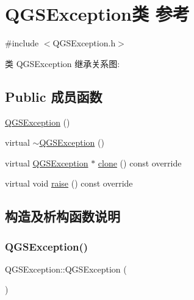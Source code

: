 \hypertarget{class_q_g_s_exception}{}\section{Q\+G\+S\+Exception类 参考}
\label{class_q_g_s_exception}


{\ttfamily \#include $<$Q\+G\+S\+Exception.\+h$>$}



类 Q\+G\+S\+Exception 继承关系图\+:
\subsection*{Public 成员函数}
\begin{DoxyCompactItemize}
\item 
\mbox{\hyperlink{class_q_g_s_exception_aa31af3ad76a38936e999974ed1d8d423}{Q\+G\+S\+Exception}} ()
\item 
virtual \mbox{\hyperlink{class_q_g_s_exception_a974e3582111a5ddf9dbe2443148b602b}{$\sim$\+Q\+G\+S\+Exception}} ()
\item 
virtual \mbox{\hyperlink{class_q_g_s_exception}{Q\+G\+S\+Exception}} $\ast$ \mbox{\hyperlink{class_q_g_s_exception_a5b4e0c020491f88d8ed6644f1e25e082}{clone}} () const override
\item 
virtual void \mbox{\hyperlink{class_q_g_s_exception_a78e6d3c9f92bbc94440d4c2e946beed2}{raise}} () const override
\end{DoxyCompactItemize}


\subsection{构造及析构函数说明}
\mbox{\label{class_q_g_s_exception_aa31af3ad76a38936e999974ed1d8d423}} 
\subsubsection{\texorpdfstring{Q\+G\+S\+Exception()}{QGSException()}}
{\footnotesize\ttfamily Q\+G\+S\+Exception\+::\+Q\+G\+S\+Exception (\begin{DoxyParamCaption}{ }\end{DoxyParamCaption})}

\mbox{\label{class_q_g_s_exception_a974e3582111a5ddf9dbe2443148b602b}} 
